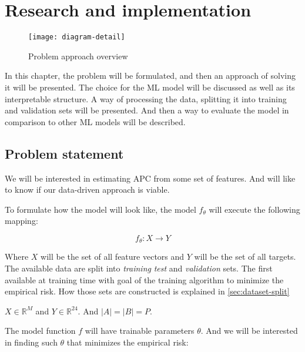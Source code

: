 \chapter{Research and implementation}
\label{ch:problem}

\begin{figure}[hb]
    \texttt{[image: diagram-detail]}
    \caption[Problem modelling overview]{Problem approach overview}
\end{figure}

In this chapter, the problem will be formulated, and then an approach of solving it will be presented. The choice for the ML model will be discussed as well as its interpretable structure. A way of processing the data, splitting it into training and validation sets will be presented. And then a way to evaluate the model in comparison to other ML models will be described.

\section{Problem statement}



We will be interested in estimating \acrfull{APC} from some set of features. And will like to know if our data-driven approach is viable.

To formulate how the model will look like, the model $f_\theta$ will execute the following mapping:

\[
    f_{\theta}: X \rightarrow Y
\]

Where $X$ will be the set of all feature vectors and $Y$ will be the set of all targets. The available data are split into \textit{training} \textit{test} and \textit{validation} sets. The first available at training time with goal of the training algorithm to minimize the empirical risk. How those sets are constructed is explained in \ref{sec:dataset-split}


$X \in \mathbb{R}^M$ and $Y\in \mathbb{R}^{24}$. And $| A | = | B | = P$.

The model function $f$ will have trainable parameters $\theta$. And we will be interested in finding such $\theta$ that minimizes the empirical risk:

